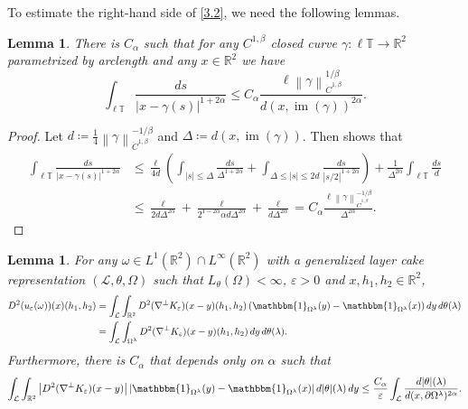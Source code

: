 \documentclass[reqno,centertags,12pt]{amsart}
\newtheorem{lemma}[theorem]{Lemma}
\theoremstyle{definition}
\numberwithin{equation}{section}
\newcommand{\abs}[1]{\left\lvert#1\right\rvert}
\newcommand{\norm}[1]{\left\|#1\right\|}
\newcommand{\bbR}{{\mathbb{R}}}
\newcommand{\bbT}{{\mathbb{T}}}
\newcommand{\eps}{\varepsilon}
\newcommand{\tht}{\theta}
\begin{document}
To estimate the right-hand side of \eqref{3.2}, we need the following lemmas.

\begin{lemma}\label{L3.5}
    There is $C_{\alpha}$ such that for any $C^{1,\beta}$ closed curve
    $\gamma\colon\ell\bbT\to\bbR^{2}$ parametrized by arclength and any $x\in\bbR^{2}$ we have
    \[
        \int_{\ell\bbT}\frac{ds}{\abs{x - \gamma(s)}^{1+2\alpha}}
        \leq C_{\alpha}\frac{\ell\norm{\gamma}_{\dot{C}^{1,\beta}}^{1/\beta}}
        {d(x,\operatorname{im}(\gamma))^{2\alpha}}.
    \]
\end{lemma}

\begin{proof}
    Let $d\coloneqq\frac{1}{4}\norm{\gamma}_{\dot{C}^{1,\beta}}^{-1/\beta}$
    and $\Delta\coloneqq d(x,\operatorname{im}(\gamma))$.
    Then \cite[Lemma~A.2]{JeoZlaTouching} shows that
    \begin{align*}
        \int_{\ell\bbT}\frac{ds}{\abs{x - \gamma(s)}^{1+2\alpha}}
        &\leq \frac{\ell}{4d}\left(
            \int_{\abs{s}\leq\Delta}\frac{ds}{\Delta^{1+2\alpha}}
            + \int_{\Delta\leq\abs{s}\leq 2d}\frac{ds}{\abs{s/2}^{1+2\alpha}}
        \right)
        + \frac{1}{\Delta^{2\alpha}}\int_{\ell\bbT}\frac{ds}{d} \\
        &\leq \frac{\ell}{2d\Delta^{2\alpha}}
        + \frac{\ell}{2^{1-2\alpha}\alpha d\Delta^{2\alpha}}
        + \frac{\ell}{d\Delta^{2\alpha}}
        = C_{\alpha}\frac{\ell\norm{\gamma}_{\dot{C}^{1,\beta}}^{-1/\beta}}
        {\Delta^{2\alpha}}.
    \end{align*}
\end{proof}

\begin{lemma}\label{L3.6}
    For any $\omega\in L^{1}(\bbR^{2})\cap L^{\infty}(\bbR^{2})$ with
    a generalized layer cake representation $(\mathcal{L},\theta,\Omega)$
    such that $L_{\tht}(\Omega)<\infty$, $\eps>0$ and $x,h_{1},h_{2}\in\bbR^{2}$,
    \begin{align*}
        D^{2}(u_{\eps}(\omega))(x)(h_{1},h_{2})
        &= \int_{\mathcal{L}}\int_{\bbR^{2}}
        D^{2}(\nabla^{\perp}K_{\eps})(x - y)(h_{1},h_{2})
        \left(\mathbbm{1}_{\Omega^{\lambda}}(y) - \mathbbm{1}_{\Omega^{\lambda}}(x)\right)
        dy\,d\theta(\lambda) \\
        &= \int_{\mathcal{L}}\int_{\Omega^{\lambda}}
        D^{2}(\nabla^{\perp}K_{\eps})(x - y)(h_{1},h_{2})
        \,dy\,d\theta(\lambda).
    \end{align*}
    Furthermore, there is $C_{\alpha}$ that depends only on $\alpha$ such that
    \[
        \int_{\mathcal{L}}\int_{\bbR^{2}}
        \abs{D^{2}(\nabla^{\perp}K_{\eps})(x - y)}
        \abs{\mathbbm{1}_{\Omega^{\lambda}}(y) - \mathbbm{1}_{\Omega^{\lambda}}(x)}
        d|\theta|(\lambda)\,dy
        \leq \frac{C_{\alpha}}{\eps}
        \int_{\mathcal{L}}\frac{d|\theta|(\lambda)}{d(x,\partial\Omega^{\lambda})^{2\alpha}}.
    \]
\end{lemma}
\end{document}
